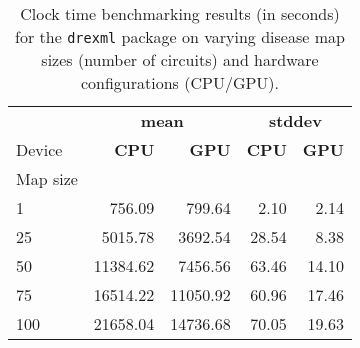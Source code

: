 \begin{table}
\centering
\caption{Clock time benchmarking results (in seconds) for the \texttt{drexml} 
    package on varying disease map sizes (number of circuits) and hardware 
    configurations (CPU/GPU).
}
\label{tab:time}
\begin{tabular}{lrrrr}
\toprule
 & \multicolumn{2}{c}{\textbf{mean}} & \multicolumn{2}{c}{\textbf{stddev}} \\
Device & \textbf{CPU} & \textbf{GPU} & \textbf{CPU} & \textbf{GPU} \\
Map size &  &  &  &  \\
\midrule
1 & 756.09 & 799.64 & 2.10 & 2.14 \\
25 & 5015.78 & 3692.54 & 28.54 & 8.38 \\
50 & 11384.62 & 7456.56 & 63.46 & 14.10 \\
75 & 16514.22 & 11050.92 & 60.96 & 17.46 \\
100 & 21658.04 & 14736.68 & 70.05 & 19.63 \\
\bottomrule
\end{tabular}
\end{table}
